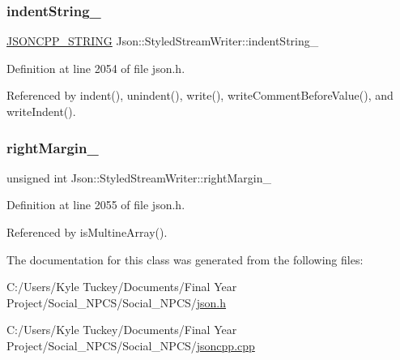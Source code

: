 \mbox{\label{class_json_1_1_styled_stream_writer_a1481433ebe1491ea83b0beb92aed56c2}} 
\subsubsection{\texorpdfstring{indent\+String\+\_\+}{indentString\_}}
{\footnotesize\ttfamily \hyperlink{json_8h_a1e723f95759de062585bc4a8fd3fa4be}{J\+S\+O\+N\+C\+P\+P\+\_\+\+S\+T\+R\+I\+NG} Json\+::\+Styled\+Stream\+Writer\+::indent\+String\+\_\+\hspace{0.3cm}{\ttfamily [private]}}



Definition at line 2054 of file json.\+h.



Referenced by indent(), unindent(), write(), write\+Comment\+Before\+Value(), and write\+Indent().

\mbox{\label{class_json_1_1_styled_stream_writer_a94299ec0a9bb925b2dbbab7c1f2b390a}} 
\subsubsection{\texorpdfstring{right\+Margin\+\_\+}{rightMargin\_}}
{\footnotesize\ttfamily unsigned int Json\+::\+Styled\+Stream\+Writer\+::right\+Margin\+\_\+\hspace{0.3cm}{\ttfamily [private]}}



Definition at line 2055 of file json.\+h.



Referenced by is\+Multine\+Array().



The documentation for this class was generated from the following files\+:\begin{DoxyCompactItemize}
\item 
C\+:/\+Users/\+Kyle Tuckey/\+Documents/\+Final Year Project/\+Social\+\_\+\+N\+P\+C\+S/\+Social\+\_\+\+N\+P\+C\+S/\hyperlink{json_8h}{json.\+h}\item 
C\+:/\+Users/\+Kyle Tuckey/\+Documents/\+Final Year Project/\+Social\+\_\+\+N\+P\+C\+S/\+Social\+\_\+\+N\+P\+C\+S/\hyperlink{jsoncpp_8cpp}{jsoncpp.\+cpp}\end{DoxyCompactItemize}
